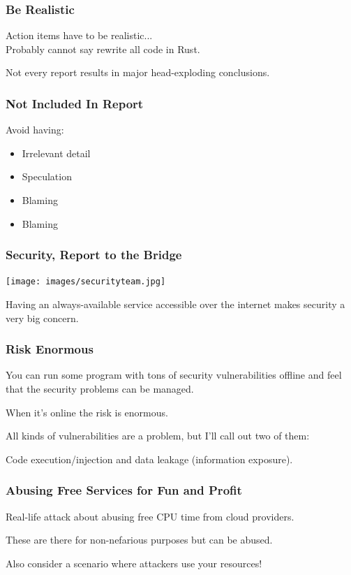 \begin{frame}
\frametitle{Be Realistic}

Action items have to be realistic...\\
\quad Probably cannot say rewrite all code in Rust.

Not every report results in major head-exploding conclusions.

\end{frame}


\begin{frame}
\frametitle{Not Included In Report}

Avoid having:

\begin{itemize}
	\item Irrelevant detail
	\item Speculation
	\item Blaming
	\item Blaming
\end{itemize}


\end{frame}




\begin{frame}
\frametitle{Security, Report to the Bridge}

\begin{center}
	\texttt{[image: images/securityteam.jpg]}
\end{center}

Having an always-available service accessible over the internet makes security a very big concern.

\end{frame}

\begin{frame}
\frametitle{Risk Enormous}

You can run some program with tons of security vulnerabilities offline and feel that the security problems can be managed. 

When it's online the risk is enormous. 

All kinds of vulnerabilities are a problem, but I'll call out two of them:

Code execution/injection and data leakage (information exposure). 


\end{frame}


\begin{frame}
\frametitle{Abusing Free Services for Fun and Profit}

Real-life attack about abusing free CPU time from cloud providers.

These are there for non-nefarious purposes but can be abused.

Also consider a scenario where attackers use your resources!

\end{frame}



